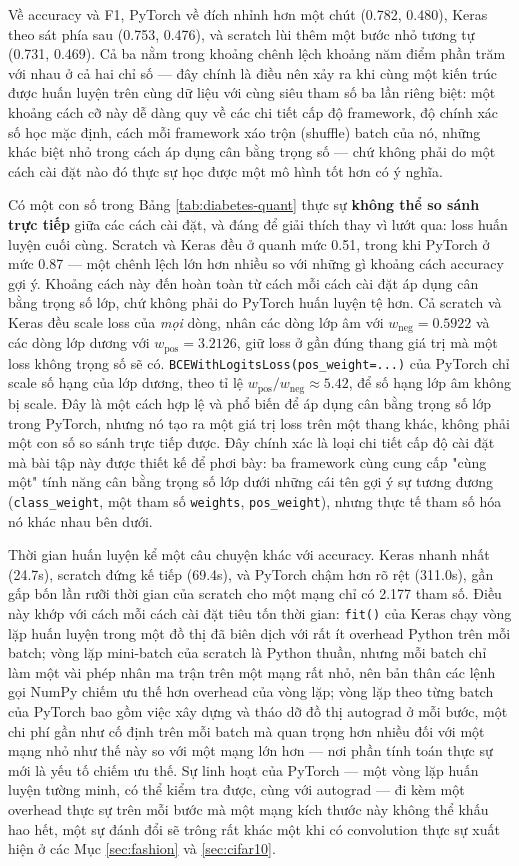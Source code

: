 \documentclass[11pt]{article}
\newcommand{\code}[1]{\texttt{#1}}
\begin{document}
Về accuracy và F1, PyTorch về đích nhỉnh hơn một chút (0.782, 0.480), Keras
theo sát phía sau (0.753, 0.476), và scratch lùi thêm một bước nhỏ tương tự
(0.731, 0.469). Cả ba nằm trong khoảng chênh lệch khoảng năm điểm phần
trăm với nhau ở cả hai chỉ số — đây chính là điều nên xảy ra khi cùng một
kiến trúc được huấn luyện trên cùng dữ liệu với cùng siêu tham số ba lần
riêng biệt: một khoảng cách cỡ này dễ dàng quy về các chi tiết cấp độ
framework, độ chính xác số học mặc định, cách mỗi framework xáo trộn
(shuffle) batch của nó, những khác biệt nhỏ trong cách áp dụng cân bằng
trọng số — chứ không phải do một cách cài đặt nào đó thực sự học được một
mô hình tốt hơn có ý nghĩa.

Có một con số trong Bảng \ref{tab:diabetes-quant} thực sự \textbf{không thể
so sánh trực tiếp} giữa các cách cài đặt, và đáng để giải thích thay vì lướt
qua: loss huấn luyện cuối cùng. Scratch và Keras đều ở quanh mức 0.51,
trong khi PyTorch ở mức 0.87 — một chênh lệch lớn hơn nhiều so với những
gì khoảng cách accuracy gợi ý. Khoảng cách này đến hoàn toàn từ cách mỗi
cách cài đặt áp dụng cân bằng trọng số lớp, chứ không phải do PyTorch huấn
luyện tệ hơn. Cả scratch và Keras đều scale loss của \textit{mọi} dòng,
nhân các dòng lớp âm với $w_{\text{neg}} = 0.5922$ và các dòng lớp dương
với $w_{\text{pos}} = 3.2126$, giữ loss ở gần đúng thang giá trị mà một
loss không trọng số sẽ có. \code{BCEWithLogitsLoss(pos\_weight=...)} của
PyTorch chỉ scale số hạng của lớp dương, theo tỉ lệ
$w_{\text{pos}} / w_{\text{neg}} \approx 5.42$, để số hạng lớp âm không bị
scale. Đây là một cách hợp lệ và phổ biến để áp dụng cân bằng trọng số lớp
trong PyTorch, nhưng nó tạo ra một giá trị loss trên một thang khác, không
phải một con số so sánh trực tiếp được. Đây chính xác là loại chi tiết cấp
độ cài đặt mà bài tập này được thiết kế để phơi bày: ba framework cùng
cung cấp "cùng một" tính năng cân bằng trọng số lớp dưới những cái tên gợi
ý sự tương đương (\code{class\_weight}, một tham số \code{weights},
\code{pos\_weight}), nhưng thực tế tham số hóa nó khác nhau bên dưới.

Thời gian huấn luyện kể một câu chuyện khác với accuracy. Keras nhanh nhất
(24.7s), scratch đứng kế tiếp (69.4s), và PyTorch chậm hơn rõ rệt (311.0s),
gần gấp bốn lần rưỡi thời gian của scratch cho một mạng chỉ có 2.177 tham
số. Điều này khớp với cách mỗi cách cài đặt tiêu tốn thời gian: \code{fit()}
của Keras chạy vòng lặp huấn luyện trong một đồ thị đã biên dịch với rất ít
overhead Python trên mỗi batch; vòng lặp mini-batch của scratch là Python
thuần, nhưng mỗi batch chỉ làm một vài phép nhân ma trận trên một mạng rất
nhỏ, nên bản thân các lệnh gọi NumPy chiếm ưu thế hơn overhead của vòng
lặp; vòng lặp theo từng batch của PyTorch bao gồm việc xây dựng và tháo dỡ
đồ thị autograd ở mỗi bước, một chi phí gần như cố định trên mỗi batch mà
quan trọng hơn nhiều đối với một mạng nhỏ như thế này so với một mạng lớn
hơn — nơi phần tính toán thực sự mới là yếu tố chiếm ưu thế. Sự linh hoạt
của PyTorch — một vòng lặp huấn luyện tường minh, có thể kiểm tra được,
cùng với autograd — đi kèm một overhead thực sự trên mỗi bước mà một mạng
kích thước này không thể khấu hao hết, một sự đánh đổi sẽ trông rất khác
một khi có convolution thực sự xuất hiện ở các Mục \ref{sec:fashion} và
\ref{sec:cifar10}.
\end{document}
